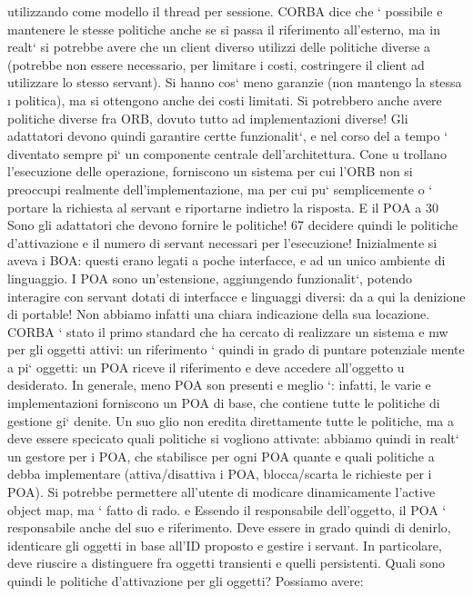\documentclass[a4paper,12pt]{article}
\begin{document}
utilizzando come modello il thread per sessione. CORBA dice che ` possibile
e
mantenere le stesse politiche anche se si passa il riferimento all'esterno, ma
in realt` si potrebbe avere che un client diverso utilizzi delle politiche diverse
a
(potrebbe non essere necessario, per limitare i costi, costringere il client ad utilizzare lo stesso servant). Si hanno
cos` meno garanzie (non mantengo la stessa
\i{}
politica), ma si ottengono anche dei costi limitati. Si potrebbero anche avere
politiche diverse fra ORB, dovuto tutto ad implementazioni diverse!
Gli adattatori devono quindi garantire certte funzionalit`, e nel corso del
a
tempo ` diventato sempre pi` un componente centrale dell'architettura. Cone
u
trollano l'esecuzione delle operazione, forniscono un sistema per cui l'ORB non
si preoccupi realmente dell'implementazione, ma per cui pu` semplicemente
o
`
portare la richiesta al servant e riportarne indietro la risposta. E il POA a
30 Sono
gli adattatori che devono fornire le politiche!
67
\newpage
decidere quindi le politiche d'attivazione e il numero di servant necessari per
l'esecuzione!
Inizialmente si aveva i BOA: questi erano legati a poche interfacce, e ad un
unico ambiente di linguaggio. I POA sono un'estensione, aggiungendo funzionalit`, potendo interagire con servant dotati
di interfacce e linguaggi diversi: da
a
qui la denizione di portable! Non abbiamo infatti una chiara indicazione della
sua locazione.
CORBA ` stato il primo standard che ha cercato di realizzare un sistema
e
mw per gli oggetti attivi: un riferimento ` quindi in grado di puntare potenziale
mente a pi` oggetti: un POA riceve il riferimento e deve accedere all'oggetto
u
desiderato. In generale, meno POA son presenti e meglio `: infatti, le varie
e
implementazioni forniscono un POA di base, che contiene tutte le politiche di
gestione gi` denite. Un suo glio non eredita direttamente tutte le politiche, ma
a
deve essere specicato quali politiche si vogliono attivate: abbiamo quindi in realt` un gestore per i POA, che
stabilisce per ogni POA quante e quali politiche
a
debba implementare (attiva/disattiva i POA, blocca/scarta le richieste per i
POA). Si potrebbe permettere all'utente di modicare dinamicamente l'active
object map, ma ` fatto di rado.
e
Essendo il responsabile dell'oggetto, il POA ` responsabile anche del suo
e
riferimento. Deve essere in grado quindi di denirlo, identicare gli oggetti in
base all'ID proposto e gestire i servant. In particolare, deve riuscire a distinguere
fra oggetti transienti e quelli persistenti.
Quali sono quindi le politiche d'attivazione per gli oggetti? Possiamo avere:
\end{document}
